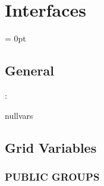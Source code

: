 
\section{Interfaces} 


\parskip = 0pt

\vspace{3mm} \subsection*{General}

: 

nullvars
\vspace{2mm}
\subsection*{Grid Variables}
\vspace{5mm}\subsubsection{PUBLIC GROUPS}

\vspace{5mm}

